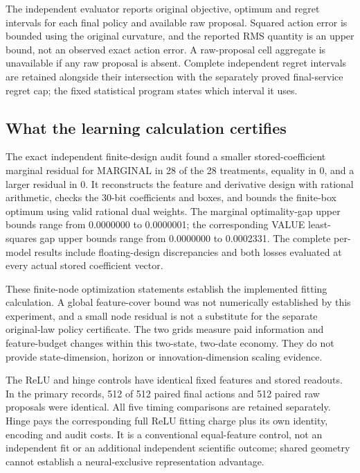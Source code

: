 The independent evaluator reports original objective, optimum and regret intervals for each final policy and available raw proposal. Squared action error is bounded using the original curvature, and the reported RMS quantity is an upper bound, not an observed exact action error. A raw-proposal cell aggregate is unavailable if any raw proposal is absent. Complete independent regret intervals are retained alongside their intersection with the separately proved final-service regret cap; the fixed statistical program states which interval it uses.

\subsection{What the learning calculation certifies}\label{subsec:fitresults121}

The exact independent finite-design audit found a smaller stored-coefficient marginal residual for MARGINAL in 28 of the 28 treatments, equality in 0, and a larger residual in 0. It reconstructs the feature and derivative design with rational arithmetic, checks the 30-bit coefficients and boxes, and bounds the finite-box optimum using valid rational dual weights. The marginal optimality-gap upper bounds range from 0.0000000 to 0.0000001; the corresponding VALUE least-squares gap upper bounds range from 0.0000000 to 0.0002331. The complete per-model results include floating-design discrepancies and both losses evaluated at every actual stored coefficient vector.

These finite-node optimization statements establish the implemented fitting calculation. A global feature-cover bound was not numerically established by this experiment, and a small node residual is not a substitute for the separate original-law policy certificate. The two grids measure paid information and feature-budget changes within this two-state, two-date economy. They do not provide state-dimension, horizon or innovation-dimension scaling evidence.

The ReLU and hinge controls have identical fixed features and stored readouts. In the primary records, 512 of 512 paired final actions and 512 paired raw proposals were identical. All five timing comparisons are retained separately. Hinge pays the corresponding full ReLU fitting charge plus its own identity, encoding and audit costs. It is a conventional equal-feature control, not an independent fit or an additional independent scientific outcome; shared geometry cannot establish a neural-exclusive representation advantage.

